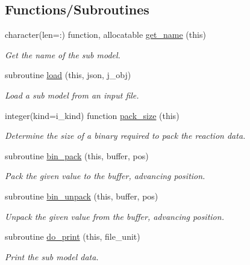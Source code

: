 \subsection*{Functions/\+Subroutines}
\begin{DoxyCompactItemize}
\item 
character(len=\+:) function, allocatable \mbox{\hyperlink{namespacepmc__sub__model__data_abb4112b25cd30b34833545bda008a983}{get\+\_\+name}} (this)
\begin{DoxyCompactList}\small\item\em Get the name of the sub model. \end{DoxyCompactList}\item 
subroutine \mbox{\hyperlink{namespacepmc__sub__model__data_a86c095dd6877245396aa7313674e462e}{load}} (this, json, j\+\_\+obj)
\begin{DoxyCompactList}\small\item\em Load a sub model from an input file. \end{DoxyCompactList}\item 
integer(kind=i\+\_\+kind) function \mbox{\hyperlink{namespacepmc__sub__model__data_ae6c19a335b730ac8a36548c74df62c73}{pack\+\_\+size}} (this)
\begin{DoxyCompactList}\small\item\em Determine the size of a binary required to pack the reaction data. \end{DoxyCompactList}\item 
subroutine \mbox{\hyperlink{namespacepmc__sub__model__data_a1432364c7373b5b48e8251cef83cdcfe}{bin\+\_\+pack}} (this, buffer, pos)
\begin{DoxyCompactList}\small\item\em Pack the given value to the buffer, advancing position. \end{DoxyCompactList}\item 
subroutine \mbox{\hyperlink{namespacepmc__sub__model__data_a2cdea3a37ab472a7095932175ddba75c}{bin\+\_\+unpack}} (this, buffer, pos)
\begin{DoxyCompactList}\small\item\em Unpack the given value from the buffer, advancing position. \end{DoxyCompactList}\item 
subroutine \mbox{\hyperlink{namespacepmc__sub__model__data_aa1a6115c9e5f44ce5e6716748ba06072}{do\+\_\+print}} (this, file\+\_\+unit)
\begin{DoxyCompactList}\small\item\em Print the sub model data. \end{DoxyCompactList}\end{DoxyCompactItemize}


